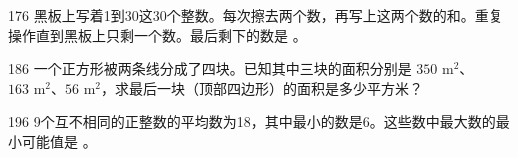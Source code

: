 \begin{question}{17}{6}
黑板上写着1到30这30个整数。每次擦去两个数，再写上这两个数的和。重复操作直到黑板上只剩一个数。最后剩下的数是 \answerline。
\end{question}

\begin{question}{18}{6}
一个正方形被两条线分成了四块。已知其中三块的面积分别是 \(350\text{ m}^2\)、\(163\text{ m}^2\)、\(56\text{ m}^2\)，求最后一块（顶部四边形）的面积是多少平方米？

\noindent
{}

\end{question}

\enlargethispage{8mm}
\begin{question}{19}{6}
9个互不相同的正整数的平均数为18，其中最小的数是6。这些数中最大数的最小可能值是 \answerline。
\end{question}


